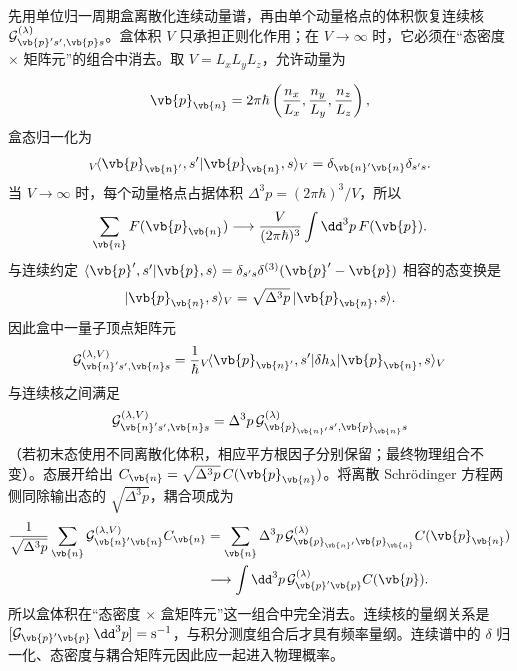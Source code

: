 \begin{derivation}[盒态与连续态的模式耦合归一化]
先用单位归一周期盒离散化连续动量谱，再由单个动量格点的体积恢复连续核 $\mathcal G^{(\lambda)}_{\vb{p}'s',\vb{p}s}$。盒体积 $V$ 只承担正则化作用；在 $V\to\infty$ 时，它必须在“态密度 $\times$ 矩阵元”的组合中消去。取 $V=L_xL_yL_z$，允许动量为

\begin{equation*}
\vb{p}_{\vb{n}}
=2\pi\hbar\left(\frac{n_x}{L_x},\frac{n_y}{L_y},\frac{n_z}{L_z}\right),
\end{equation*}
盒态归一化为
\begin{equation*}
{}_V\!\langle\vb{p}_{\vb{n}'},s'|\vb{p}_{\vb{n}},s\rangle_V
=\delta_{\vb{n}'\vb{n}}\delta_{s's}.
\end{equation*}
当 $V\to\infty$ 时，每个动量格点占据体积 $\Delta^3p=(2\pi\hbar)^3/V$，所以
\begin{equation*}
\sum_{\vb{n}}F(\vb{p}_{\vb{n}})
\longrightarrow
\frac{V}{(2\pi\hbar)^3}\int\dd^3 p\,F(\vb{p}).
\end{equation*}
与连续约定
$\langle\vb{p}',s'|\vb{p},s\rangle=\delta_{s's}\delta^{(3)}(\vb{p}'-\vb{p})$
相容的态变换是
\begin{equation*}
|\vb{p}_{\vb{n}},s\rangle_V
=\sqrt{\Delta^3p}\,|\vb{p}_{\vb{n}},s\rangle.
\end{equation*}
因此盒中一量子顶点矩阵元
\begin{equation*}
\mathcal G^{(\lambda,V)}_{\vb{n}'s',\vb{n}s}
=\frac1\hbar{}_V\!\langle\vb{p}_{\vb{n}'},s'|
\delta h_\lambda|\vb{p}_{\vb{n}},s\rangle_V
\end{equation*}
与连续核之间满足
\begin{equation*}
\mathcal G^{(\lambda,V)}_{\vb{n}'s',\vb{n}s}
=\Delta^3p\,
\mathcal G^{(\lambda)}_{\vb{p}_{\vb{n}'}s',\vb{p}_{\vb{n}}s}
\end{equation*}
（若初末态使用不同离散化体积，相应平方根因子分别保留；最终物理组合不变）。态展开给出 $C_{\vb{n}}=\sqrt{\Delta^3p}\,C(\vb{p}_{\vb{n}})$。将离散 Schr\"odinger 方程两侧同除输出态的 $\sqrt{\Delta^3p}$，耦合项成为
\begin{align*}
\frac{1}{\sqrt{\Delta^3p}}\sum_{\vb{n}}
\mathcal G^{(\lambda,V)}_{\vb{n}'\vb{n}}C_{\vb{n}}
&=\sum_{\vb{n}}\Delta^3p\,
\mathcal G^{(\lambda)}_{\vb{p}_{\vb{n}'}\vb{p}_{\vb{n}}}C(\vb{p}_{\vb{n}})\\
&\longrightarrow\int\dd^3p\,
\mathcal G^{(\lambda)}_{\vb{p}'\vb{p}}C(\vb{p}).
\end{align*}
所以盒体积在“态密度 $\times$ 盒矩阵元”这一组合中完全消去。连续核的量纲关系是 $[\mathcal G_{\vb{p}'\vb{p}}\,\dd^3p]={\rm s^{-1}}$，与积分测度组合后才具有频率量纲。连续谱中的 $\delta$ 归一化、态密度与耦合矩阵元因此应一起进入物理概率。
\end{derivation}
